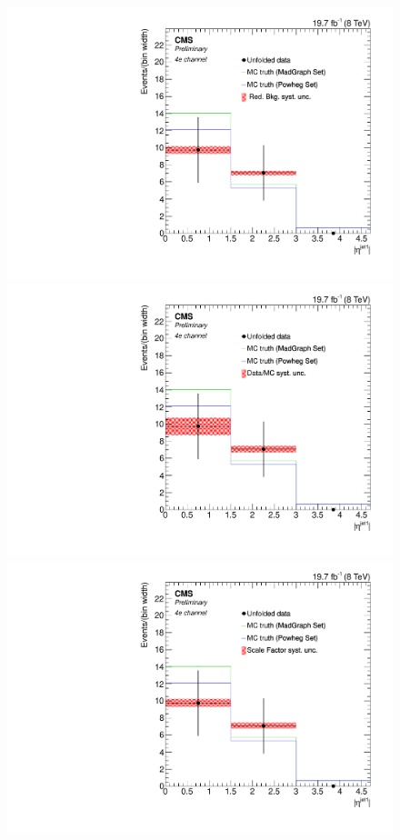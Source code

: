 \begin{figure}[hbtp]
\begin{center}
   \includegraphics[width=0.8\cmsFigWidth]{Figures/Unfolding/Systematics/ZZTo4e_EtaJet1_RedBkg_Mad_fr}     
  \includegraphics[width=0.8\cmsFigWidth]{Figures/Unfolding/Systematics/ZZTo4e_EtaJet1_UnfDataOverGenMC_Mad_fr}     
   \includegraphics[width=0.8\cmsFigWidth]{Figures/Unfolding/Systematics/ZZTo4e_EtaJet1_SFSq_Mad_fr}

\end{center}
\end{figure}
